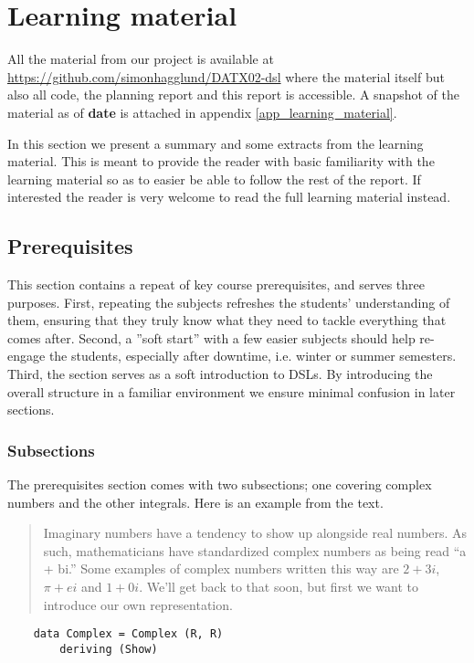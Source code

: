 \section{Learning material}
All the material from our project is available at \url{https://github.com/simonhagglund/DATX02-dsl} where the material itself but also all code, the planning report and this report is accessible.  A snapshot of the material as of \textbf{date} is attached in appendix \ref{app_learning_material}. 

In this section we present a summary and some extracts from the learning material. This is meant to provide the reader with basic familiarity with the learning material so as to easier be able to follow the rest of the report. If interested the reader is very welcome to read the full learning material instead.

\subsection{Prerequisites}
This section contains a repeat of key course prerequisites, and serves three purposes. First, repeating the subjects refreshes the students' understanding of them, ensuring that they truly know what they need to tackle everything that comes after. Second, a ''soft start'' with a few easier subjects should help re-engage the students, especially after downtime, i.e. winter or summer semesters. Third, the section serves as a soft introduction to DSLs. By introducing the overall structure in a familiar environment we ensure minimal confusion in later sections.

\subsubsection{Subsections} The prerequisites section comes with two subsections; one covering complex numbers and the other integrals. Here is an example from the text.

\blockquote{Imaginary numbers have a tendency to show up alongside real numbers. As such, mathematicians have standardized complex numbers as being read ``a + bi.'' Some examples of complex numbers written this way are $2+3i$, $\pi + ei$ and $1+0i$. 
We'll get back to that soon, but first we want to introduce our own representation. 
}
\begin{verbatim}
    data Complex = Complex (R, R)
        deriving (Show)
\end{verbatim}

